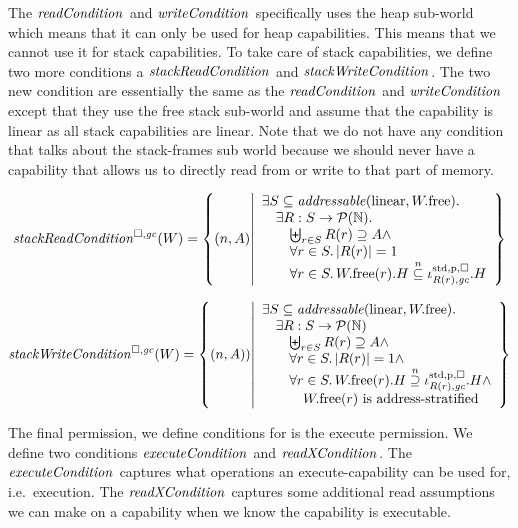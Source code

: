 \begin{jversion}
The $\readCond[]{}$ and $\writeCond[]{}$ specifically uses the heap sub-world which means that it can only be used for heap capabilities.
This means that we cannot use it for stack capabilities.
To take care of stack capabilities, we define two more conditions a $\stackReadCond[]{}$ and $\stackWriteCond[]{}$.
The two new condition are essentially the same as the $\readCond[]{}$ and $\writeCond[]{}$ except that they use the free stack sub-world and assume that the capability is linear as all stack capabilities are linear.
Note that we do not have any condition that talks about the stack-frames sub world because we should never have a capability that allows us to directly read from or write to that part of memory.
\begin{definition}
\[
  \stackReadCond{W} = \left\{ \npair{A} \middle| 
    \begin{array}{l}
      \exists S \subseteq \addressable{\linear, \pwfree} \ldotp \\
      \quad \exists R : S \fun \powerset{\nats} \ldotp\\
      \qquad \biguplus_{r\in S} R(r) \supseteq A \wedge \\
      \qquad \forall r \in S \ldotp |R(r)| = 1\\
      \qquad \forall r \in S \ldotp \pwfree(r).H \nsubeq \stdreg{R(r),\gc}{\pur}.H
    \end{array}
  \right\}
\]
\end{definition}
\begin{definition}
\[
  \stackWriteCond{W} = \left\{ \npair{A}) \middle| 
    \begin{array}{l}
      \exists S \subseteq \addressable{\linear, \pwfree} \ldotp \\
      \quad \exists R : S \fun \powerset{\nats} \\
      \qquad \biguplus_{r\in S} R(r) \supseteq A \wedge \\
      \qquad \forall r \in S \ldotp |R(r)| = 1 \wedge \\
      \qquad \forall r \in S \ldotp \pwfree(r).H \nsupeq \stdreg{R(r),\gc}{\pur}.H \wedge\\
      \qquad \quad \pwfree(r) \text{ is address-stratified}
    \end{array}
  \right\}
\]
\end{definition}
The final permission, we define conditions for is the execute permission.
We define two conditions $\execCond[]{}$ and $\xReadCond[]{}$.
The $\execCond[]{}$ captures what operations an execute-capability can be used for, i.e.\ execution.
The $\xReadCond[]{}$ captures some additional read assumptions we can make on a capability when we know the capability is executable.


\end{jversion}

